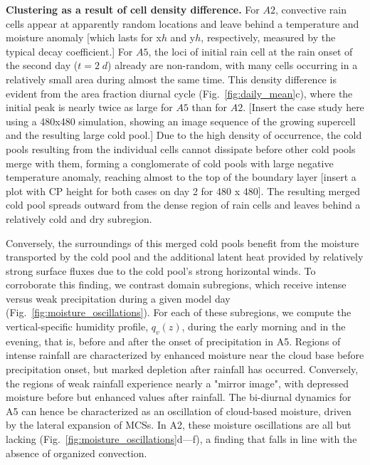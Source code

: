 \documentclass[draft,linenumbers]{agujournal2019}
\begin{document}
\noindent
{\bf Clustering as a result of cell density difference.}
For $A2$, convective rain cells appear at apparently random locations and leave behind a temperature and moisture anomaly [which lasts for x$h$ and y$h$, respectively, measured by the typical decay coefficient.]
For $A5$, the loci of initial rain cell at the rain onset of the second day ($t=2\;d$) already are non-random, with many cells occurring in a relatively small area during almost the same time. 
This density difference is evident from the area fraction diurnal cycle (Fig.~\ref{fig:daily_mean}c), where the initial peak is nearly twice as large for $A5$ than for $A2$. 
[Insert the case study here using a 480x480 simulation, showing an image sequence of the growing supercell and the resulting large cold pool.]
Due to the high density of occurrence, the cold pools resulting from the individual cells cannot dissipate before other cold pools merge with them, forming a conglomerate of cold pools with large negative temperature anomaly, reaching almost to the top of the boundary layer [insert a plot with CP height for both cases on day 2 for 480 x 480].
The resulting merged cold pool spreads outward from the dense region of rain cells and leaves behind a relatively cold and dry subregion.

Conversely, the surroundings of this merged cold pools benefit from the moisture transported by the cold pool and the additional latent heat provided by relatively strong surface fluxes due to the cold pool's strong horizontal winds.
To corroborate this finding, we contrast domain subregions, which receive intense versus weak precipitation during a given model day (Fig.~\ref{fig:moisture_oscillations}).
For each of these subregions, we compute the vertical-specific humidity profile, $q_v(z)$, during the early morning and in the evening, that is, before and after the onset of precipitation in A5.
Regions of intense rainfall are characterized by enhanced moisture near the cloud base before precipitation onset, but marked depletion after rainfall has occurred.
Conversely, the regions of weak rainfall experience nearly a "mirror image", with depressed moisture before but enhanced values after rainfall.
The bi-diurnal dynamics for A5 can hence be characterized as an oscillation of cloud-based moisture, driven by the lateral expansion of MCSs.
In A2, these moisture oscillations are all but lacking (Fig.~\ref{fig:moisture_oscillations}d---f), a finding that falls in line with the absence of organized convection.
\end{document}
